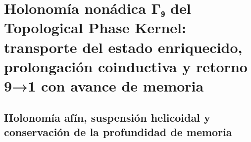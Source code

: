 \chapter{Holonomía nonádica Γ₉ del Topological Phase Kernel: transporte del estado enriquecido, prolongación coinductiva y retorno 9→1 con avance de memoria}
\label{chap:sucesor-102-08}
\label{owner:sucesor-102-20-arquitectura-desarrollo-holonomico}
\label{owner:sucesor-102-u008-u010-unicos}

\begin{HMTScientificOwnerSubordinated}
\let\HMTLabelBeforeOwnerSixD\label
\renewcommand{\label}[1]{%
  \ifstrequal{#1}{thm:eje-espejo-nonadico}%
    {\HMTLabelBeforeOwnerSixD{owner06d:thm:eje-espejo-nonadico}}%
    {\HMTLabelBeforeOwnerSixD{#1}}%
}

\end{HMTScientificOwnerSubordinated}


\section{Holonomía afín, suspensión helicoidal y conservación de la profundidad de memoria}
\begin{HMTSpiralIntegratedBody}

\end{HMTSpiralIntegratedBody}












